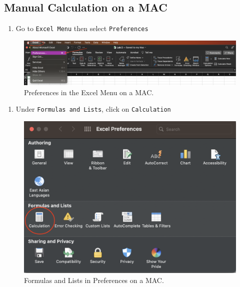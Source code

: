 \documentclass[
]{book}
\providecommand{\tightlist}{%
  \setlength{\itemsep}{0pt}\setlength{\parskip}{0pt}}
\begin{document}
\hypertarget{manual-calculation-on-a-mac}{%
\subsection{Manual Calculation on a MAC}\label{manual-calculation-on-a-mac}}

\begin{enumerate}
\def\labelenumi{\arabic{enumi}.}
\tightlist
\item
  Go to \texttt{Excel\ Menu} then select \texttt{Preferences}
\end{enumerate}

\begin{figure}

{\centering \includegraphics[width=0.9\linewidth]{manual-calculation1} 

}

\caption{Preferences in the Excel Menu on a MAC.}\label{fig:manual-calculation1}
\end{figure}

\begin{enumerate}
\def\labelenumi{\arabic{enumi}.}
\setcounter{enumi}{1}
\tightlist
\item
  Under \texttt{Formulas\ and\ Lists}, click on \texttt{Calculation}
\end{enumerate}

\begin{figure}

{\centering \includegraphics[width=0.6\linewidth]{manual-calculation2} 

}

\caption{Formulas and Lists in Preferences on a MAC.}\label{fig:manual-calculation2}
\end{figure}
\end{document}
